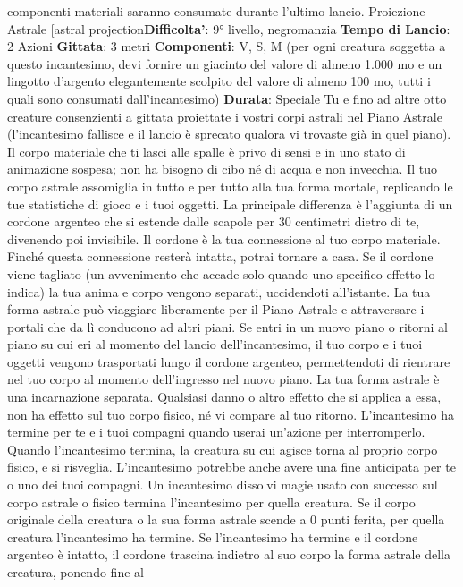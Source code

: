 \begin{multicols}{2}
componenti materiali saranno consumate durante
l’ultimo lancio.
Proiezione Astrale
[astral projection\textbf{Difficolta'}:
9° livello, negromanzia
\textbf{Tempo di Lancio}: 2 Azioni
\textbf{Gittata}: 3 metri
\textbf{Componenti}: V, S, M (per ogni creatura soggetta a
questo incantesimo, devi fornire un giacinto del valore
di almeno 1.000 mo e un lingotto d’argento
elegantemente scolpito del valore di almeno 100 mo,
tutti i quali sono consumati dall’incantesimo)
\textbf{Durata}: Speciale
Tu e fino ad altre otto creature consenzienti a gittata
proiettate i vostri corpi astrali nel Piano Astrale
(l’incantesimo fallisce e il lancio è sprecato qualora vi
trovaste già in quel piano). Il corpo materiale che ti lasci
alle spalle è privo di sensi e in uno stato di animazione
sospesa; non ha bisogno di cibo né di acqua e non
invecchia.
Il tuo corpo astrale assomiglia in tutto e per tutto alla tua
forma mortale, replicando le tue statistiche di gioco e i
tuoi oggetti. La principale differenza è l’aggiunta di un
cordone argenteo che si estende dalle scapole per 30
centimetri dietro di te, divenendo poi invisibile. Il
cordone è la tua connessione al tuo corpo materiale.
Finché questa connessione resterà intatta, potrai
tornare a casa. Se il cordone viene tagliato (un
avvenimento che accade solo quando uno specifico
effetto lo indica) la tua anima e corpo vengono separati,
uccidendoti all’istante.
La tua forma astrale può viaggiare liberamente per il
Piano Astrale e attraversare i portali che da lì
conducono ad altri piani. Se entri in un nuovo piano o
ritorni al piano su cui eri al momento del lancio
dell’incantesimo, il tuo corpo e i tuoi oggetti vengono
trasportati lungo il cordone argenteo, permettendoti di
rientrare nel tuo corpo al momento dell’ingresso nel
nuovo piano. La tua forma astrale è una incarnazione
separata. Qualsiasi danno o altro effetto che si applica
a essa, non ha effetto sul tuo corpo fisico, né vi
compare al tuo ritorno.
L’incantesimo ha termine per te e i tuoi compagni
quando userai un’azione per interromperlo. Quando
l’incantesimo termina, la creatura su cui agisce torna al
proprio corpo fisico, e si risveglia.
L’incantesimo potrebbe anche avere una fine anticipata
per te o uno dei tuoi compagni. Un incantesimo dissolvi
magie usato con successo sul corpo astrale o fisico
termina l’incantesimo per quella creatura. Se il corpo
originale della creatura o la sua forma astrale scende a
0 punti ferita, per quella creatura l’incantesimo ha
termine. Se l’incantesimo ha termine e il cordone
argenteo è intatto, il cordone trascina indietro al suo
corpo la forma astrale della creatura, ponendo fine al

\end{multicols}

